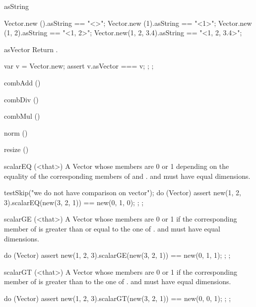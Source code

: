 \begin{urbiscriptapi}
\item[asString]%
\begin{urbiassert}
Vector.new         ().asString == "<>";
Vector.new        (1).asString == "<1>";
Vector.new     (1, 2).asString == "<1, 2>";
Vector.new(1, 2, 3.4).asString == "<1, 2, 3.4>";
\end{urbiassert}

\item[asVector]%
  Return \this.
\begin{urbiscript}
{
  var v = Vector.new;
  assert { v.asVector === v; };
};
\end{urbiscript}

\item[combAdd]()%

\item[combDiv]()%

\item[combMul]()%

\item[norm]()%

\item[resize]()%

\item[scalarEQ](<that>)%
  A Vector whose members are 0 or 1 depending on the equality of the
  corresponding members of \this and \that.  \this and \that must have equal
  dimensions.
\begin{urbiscript}
testSkip("we do not have comparison on vector");
do (Vector)
{
  assert
  {
    new(1, 2, 3).scalarEQ(new(3, 2, 1)) == new(0, 1, 0);
  };
};
\end{urbiscript}

\item[scalarGE](<that>)%
  A Vector whose members are 0 or 1 if the corresponding member of \this is
  greater than or equal to the one of \that.  \this and \that must have equal
  dimensions.
\begin{urbiscript}
do (Vector)
{
  assert
  {
    new(1, 2, 3).scalarGE(new(3, 2, 1)) == new(0, 1, 1);
  };
};
\end{urbiscript}

\item[scalarGT](<that>)%
  A Vector whose members are 0 or 1 if the corresponding member of \this is
  greater than to the one of \that.  \this and \that must have equal
  dimensions.
\begin{urbiscript}
do (Vector)
{
  assert
  {
    new(1, 2, 3).scalarGT(new(3, 2, 1)) == new(0, 0, 1);
  };
};
\end{urbiscript}


\end{urbiscriptapi}
